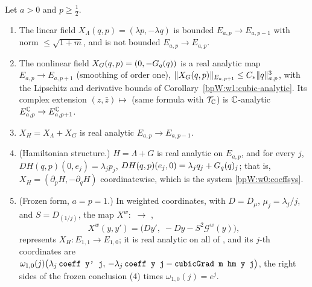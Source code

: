\begin{proposition}\label{bpW:w1:hamfield}
Let $a>0$ and $p\ge\frac12$.
\begin{enumerate}[label=(\roman*)]
\item The linear field $X_\Lambda(q,p)=(\lambda p,-\lambda q)$ is bounded $E_{a,p}\to E_{a,p-1}$ with norm
  $\le\sqrt{1+m}$, and is not bounded $E_{a,p}\to E_{a,p}$.
\item The nonlinear field $X_G(q,p)=(0,-G_q(q))$ is a real analytic map $E_{a,p}\to E_{a,p+1}$ (smoothing of order
  one), $\lVert X_G(q,p)\rVert_{E_{a,p+1}}\le C_*\lVert q\rVert_{a,p}^3$, with the Lipschitz and derivative bounds of
  Corollary~\ref{bpW:w1:cubic-analytic}. Its complex extension $(z,\bar z)\mapsto$ (same formula with
  $\mathcal T_{\mathbb{C}}$) is $\mathbb{C}$-analytic $E^{\mathbb{C}}_{a,p}\to E^{\mathbb{C}}_{a,p+1}$.
\item $X_H=X_\Lambda+X_G$ is real analytic $E_{a,p}\to E_{a,p-1}$.
\item (Hamiltonian structure.) $H=\Lambda+G$ is real analytic on $E_{a,p}$, and for every $j$,
  $DH(q,p)(0,e_j)=\lambda_jp_j$, $DH(q,p)(e_j,0)=\lambda_jq_j+G_q(q)_j$; that is,
  $X_H=(\partial_pH,-\partial_qH)$ coordinatewise, which is the system \eqref{bpW:w0:coeffsys}.
\item (Frozen form, $a=p=1$.) In weighted coordinates, with $D=D_\mu$, $\mu_j=\lambda_j/j$, and $S=D_{(1/j)}$, the
  map $X^w:$  $\to$ ,
  \[X^w(y,y')=\bigl(Dy',\;-Dy-S^2\mathcal G^w(y)\bigr),\]
  represents $X_H:E_{1,1}\to E_{1,0}$; it is real analytic on all of , and its $j$-th coordinates
  are $\omega_{1,0}(j)\bigl(\lambda_j\,\texttt{coeff y' j},\,-\lambda_j\,\texttt{coeff y j}-\texttt{cubicGrad m hm y j}\bigr)$,
  the right sides of the frozen conclusion (4) times $\omega_{1,0}(j)=e^j$.
\end{enumerate}
\end{proposition}

